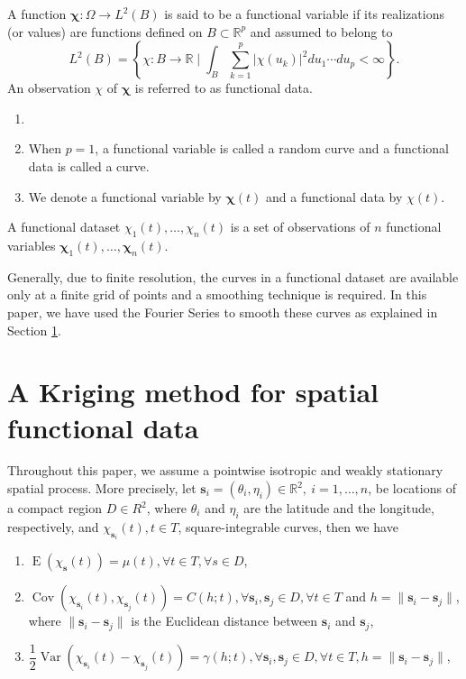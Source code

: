 \documentclass[]{interact}
\theoremstyle{plain}%
\theoremstyle{definition}
\theoremstyle{remark}
\DeclareMathOperator{\vari}{Var}
\DeclareMathOperator{\espe}{E}
\DeclareMathOperator{\cov}{Cov}
\let\BeginKnitrBlock\begin \let\EndKnitrBlock\end
\begin{document}
\BeginKnitrBlock{definition}
\protect\hypertarget{def:unnamed-chunk-1}{}{\label{def:unnamed-chunk-1} }A function \(\bm{\chi}: \Omega \rightarrow L^2(B)\) is said to be a functional variable if its realizations (or values) are functions defined on \(B \subset \mathbb{R}^ p\) and assumed to belong to
\[
    L^2(B) = \left\{\chi:B \longrightarrow \mathbb{R} \mid \int_B \sum_{k=1}^{p} \lvert \chi(u_k) \rvert^2 du_1\cdots du_p < \infty \right\}.
\]
An observation \(\chi\) of \(\bm{\chi}\) is referred to as functional data.
\EndKnitrBlock{definition}

\BeginKnitrBlock{remark}
{}

\begin{enumerate}
  \item[]
  \item When $p = 1$, a functional variable is called a random curve and a functional data is called a curve.
  \item We denote a functional variable by $\bm{\chi}(t)$ and a functional data by $\chi(t)$.
\end{enumerate}
\EndKnitrBlock{remark}

\BeginKnitrBlock{definition}
\protect\hypertarget{def:unnamed-chunk-3}{}{\label{def:unnamed-chunk-3} }A functional dataset \(\chi_1(t), \dots, \chi_n(t)\) is a set of observations of \(n\) functional variables \(\bm{\chi}_1(t), \dots, \bm{\chi}_n(t)\).
\EndKnitrBlock{definition}

Generally, due to finite resolution, the curves in a functional dataset are available only at a finite grid of points and a smoothing technique is required.
In this paper, we have used the Fourier Series to smooth these curves as explained in Section \ref{sec:kriging}.

\hypertarget{sec:kriging}{%
\section{A Kriging method for spatial functional data}\label{sec:kriging}}

Throughout this paper, we assume a pointwise isotropic and weakly stationary spatial process. More precisely, let \(\bm{s}_i = (\theta_i, \eta_i) \in \mathbb{R}^2,\ i = 1, \dots, n\), be locations of a compact region \(D \in R^2\), where \(\theta_i\) and \(\eta_i\) are the latitude and the longitude, respectively, and \(\chi_{\bm{s}_i}(t), t \in T\), square-integrable curves, then we have

\begin{enumerate}
    \item $\espe (\chi_{\bm{s}}(t)) = \mu(t), \forall t \in T, \forall s \in D$,
    \item $\cov(\chi_{\bm{s}_i}(t), \chi_{\bm{s}_j}(t)) = C(h;t), \forall \bm{s}_i, \bm{s}_j \in D, \forall t \in T$ and 
    $h = \lVert\bm{s}_i -\bm{s}_j\rVert$, where $\lVert\bm{s}_i -\bm{s}_j\rVert$ is the Euclidean distance between $\bm{s}_i$ and $\bm{s}_j$,
    \item $\dfrac{1}{2}\vari(\chi_{\bm{s}_i}(t)-\chi_{\bm{s}_j}(t))= \gamma(h;t), \forall \bm{s}_i, \bm{s}_j \in D, \forall t \in T, h = \lVert\bm{s}_i-\bm{s}_j\rVert$,
\end{enumerate}
\end{document}
